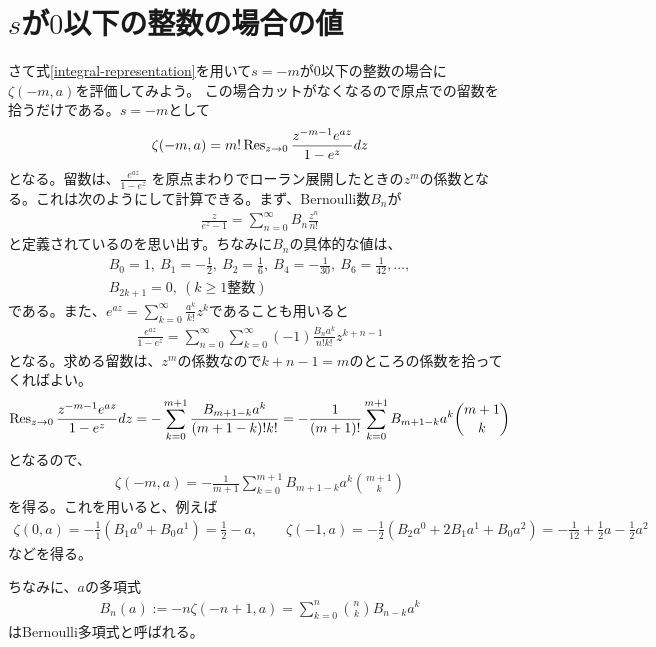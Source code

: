 \documentclass[12pt,a4paper,dvipdfmx]{jlreq}
\begin{document}
\section{$s$が$0$以下の整数の場合の値}
さて式\eqref{integral-representation}を用いて$s=-m$が$0$以下の整数の場合に$\zeta(-m,a)$を評価してみよう。
この場合カットがなくなるので原点での留数を拾うだけである。$s=-m$として
\begin{align}
  \zeta(-m,a)=m!\Res_{z\to 0}\frac{z^{-m-1}e^{az}}{1-e^{z}}dz
  \label{residue}
\end{align}
となる。留数は、$\frac{e^{az}}{1-e^{z}}$ を原点まわりでローラン展開したときの$z^m$の係数となる。これは次のようにして計算できる。まず、Bernoulli数$B_n$が
\begin{align}
  \frac{z}{e^z-1}=\sum_{n=0}^{\infty}B_{n}\frac{z^n}{n!}
\end{align}
と定義されているのを思い出す。ちなみに$B_n$の具体的な値は、
\begin{align}
  B_0=1,\ B_1=-\frac{1}{2},\ B_2=\frac{1}{6},\ B_4=-\frac{1}{30},\ B_6=\frac{1}{42},\dots,\\
  B_{2k+1}=0,\ (k\ge 1 \text{整数})
\end{align}
である。また、$e^{az}=\sum_{k=0}^{\infty}\frac{a^k}{k!}z^k$であることも用いると
\begin{align}
  \frac{e^{az}}{1-e^{z}}=\sum_{n=0}^{\infty}\sum_{k=0}^{\infty}(-1)\frac{B_n a^k}{n!k!}z^{k+n-1}
\end{align}
となる。求める留数は、$z^{m}$の係数なので$k+n-1=m$のところの係数を拾ってくればよい。
\begin{align}
  \Res_{z\to 0}\frac{z^{-m-1}e^{az}}{1-e^{z}}dz
  =-\sum_{k=0}^{m+1}\frac{B_{m+1-k} a^k}{(m+1-k)!k!}
  =-\frac{1}{(m+1)!}\sum_{k=0}^{m+1}B_{m+1-k} a^k\binom{m+1}{k}
\end{align}
となるので、
\begin{align}
  \zeta(-m,a)=-\frac{1}{m+1}\sum_{k=0}^{m+1}B_{m+1-k} a^k\binom{m+1}{k}
\end{align}
を得る。これを用いると、例えば
\begin{align}
  \zeta(0,a)=-\frac11(B_1a^0+B_0a^1)=\frac12-a,\qquad
  \zeta(-1,a)=-\frac12(B_2a^0+2B_1a^1+B_0a^2)=-\frac{1}{12}+\frac12 a-\frac12a^2
\end{align}
などを得る。

ちなみに、$a$の多項式
\begin{align}
  B_{n}(a):=-n\zeta(-n+1,a)=\sum_{k=0}^{n}\binom{n}{k}B_{n-k}a^k
\end{align}
はBernoulli多項式と呼ばれる。
\end{document}
